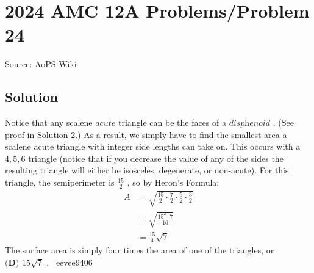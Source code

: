 \documentclass[12pt]{article}
\begin{document}
\section*{{2024 AMC 12A Problems/Problem 24}}
Source: AoPS Wiki

\subsection*{Solution}
Notice that any scalene $\textit{acute}$ triangle can be the faces of a $\textit{disphenoid}$ . (See proof in Solution 2.) As a result, we simply have to find the smallest area a scalene acute triangle with integer side lengths can take on. This occurs with a $4,5,6$ triangle (notice that if you decrease the value of any of the sides the resulting triangle will either be isosceles, degenerate, or non-acute). For this triangle, the semiperimeter is $\frac{15}{2}$ , so by Heron’s Formula: \begin{align*}
A&=\sqrt{\frac{15}{2}\cdot\frac{7}{2}\cdot\frac{5}{2}\cdot\frac{3}{2}}\\
&=\sqrt{\frac{15^2\cdot7}{16}}\\
&=\frac{15}{4}\sqrt{7}
\end{align*} The surface area is simply four times the area of one of the triangles, or $\boxed{\textbf{(D) }15\sqrt{7}}$ . ~eevee9406
\end{document}
